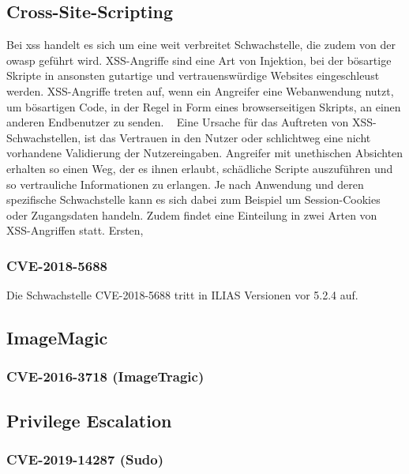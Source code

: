 \documentclass[10pt, a4paper,onecolumn ,titlepage]{article}
\begin{document}
    \subsection{Cross-Site-Scripting}
    \label{subsec:CrossSiteScripting}
    Bei \ac{xss} handelt es sich um eine weit verbreitet Schwachstelle, die zudem von der \ac{owasp} geführt wird.
    XSS-Angriffe sind eine Art von Injektion, bei der bösartige Skripte in ansonsten gutartige und vertrauenswürdige Websites eingeschleust werden.
    XSS-Angriffe treten auf, wenn ein Angreifer eine Webanwendung nutzt, um bösartigen Code, in der Regel in Form eines browserseitigen Skripts, an einen anderen Endbenutzer zu senden. ~\textcite{RN1}
    Eine Ursache für das Auftreten von XSS-Schwachstellen, ist das Vertrauen in den Nutzer oder schlichtweg eine nicht vorhandene Validierung der Nutzereingaben.
    Angreifer mit unethischen Absichten erhalten so einen Weg, der es ihnen erlaubt, schädliche Scripte auszuführen und so vertrauliche Informationen zu erlangen.
    Je nach Anwendung und deren spezifische Schwachstelle kann es sich dabei zum Beispiel um Session-Cookies oder Zugangsdaten handeln.
    Zudem findet eine Einteilung in zwei Arten von XSS-Angriffen statt. Ersten,

    \subsubsection{CVE-2018-5688}
    \label{subsubsec:CVE-2018-5688}
    Die Schwachstelle CVE-2018-5688 tritt in ILIAS Versionen vor 5.2.4 auf.

    \subsection{ImageMagic}
    \label{subsec:ImageMagic}

    \subsubsection{CVE-2016-3718 (ImageTragic)}
    \label{subsubsec:CVE-2016-3718}

    \subsection{Privilege Escalation}
    \label{subsec:PrivilegeEscalation}

    \subsubsection{CVE-2019-14287 (Sudo)}
\end{document}
